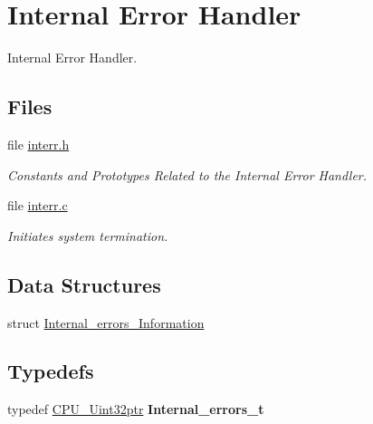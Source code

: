 \hypertarget{group__RTEMSScoreIntErr}{}\section{Internal Error Handler}
\label{group__RTEMSScoreIntErr}


Internal Error Handler.  


\subsection*{Files}
\begin{DoxyCompactItemize}
\item 
file \mbox{\hyperlink{interr_8h}{interr.\+h}}
\begin{DoxyCompactList}\small\item\em Constants and Prototypes Related to the Internal Error Handler. \end{DoxyCompactList}\item 
file \mbox{\hyperlink{cpukit_2score_2src_2interr_8c}{interr.\+c}}
\begin{DoxyCompactList}\small\item\em Initiates system termination. \end{DoxyCompactList}\end{DoxyCompactItemize}
\subsection*{Data Structures}
\begin{DoxyCompactItemize}
\item 
struct \mbox{\hyperlink{structInternal__errors__Information}{Internal\+\_\+errors\+\_\+\+Information}}
\end{DoxyCompactItemize}
\subsection*{Typedefs}
\begin{DoxyCompactItemize}
\item 
\mbox{\label{group__RTEMSScoreIntErr_gae825b779335a1cf3976090332e9b4a9d}} 
typedef \mbox{\hyperlink{group__RTEMSScoreCPUARM_ga9fca17f81f850e128fcc8ed5b87ff2ab}{C\+P\+U\+\_\+\+Uint32ptr}} {\bfseries Internal\+\_\+errors\+\_\+t}
\end{DoxyCompactItemize}
